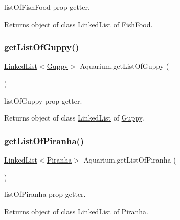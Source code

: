 list\+Of\+Fish\+Food prop getter. \begin{DoxyReturn}{Returns}
object of class \mbox{\hyperlink{class_linked_list}{Linked\+List}} of \mbox{\hyperlink{class_fish_food}{Fish\+Food}}. 
\end{DoxyReturn}
\mbox{\label{class_aquarium_a411ebb8e3ada997747567f59da24a020}} 
\subsubsection{\texorpdfstring{get\+List\+Of\+Guppy()}{getListOfGuppy()}}
{\footnotesize\ttfamily \mbox{\hyperlink{class_linked_list}{Linked\+List}}$<$\mbox{\hyperlink{class_guppy}{Guppy}}$>$ Aquarium.\+get\+List\+Of\+Guppy (\begin{DoxyParamCaption}{ }\end{DoxyParamCaption})\hspace{0.3cm}{\ttfamily [inline]}}

list\+Of\+Guppy prop getter. \begin{DoxyReturn}{Returns}
object of class \mbox{\hyperlink{class_linked_list}{Linked\+List}} of \mbox{\hyperlink{class_guppy}{Guppy}}. 
\end{DoxyReturn}
\mbox{\label{class_aquarium_a2427d901ce170774e36ca1a8ecbe8f4b}} 
\subsubsection{\texorpdfstring{get\+List\+Of\+Piranha()}{getListOfPiranha()}}
{\footnotesize\ttfamily \mbox{\hyperlink{class_linked_list}{Linked\+List}}$<$\mbox{\hyperlink{class_piranha}{Piranha}}$>$ Aquarium.\+get\+List\+Of\+Piranha (\begin{DoxyParamCaption}{ }\end{DoxyParamCaption})\hspace{0.3cm}{\ttfamily [inline]}}

list\+Of\+Piranha prop getter. \begin{DoxyReturn}{Returns}
object of class \mbox{\hyperlink{class_linked_list}{Linked\+List}} of \mbox{\hyperlink{class_piranha}{Piranha}}. 
\end{DoxyReturn}
\mbox{\label{class_aquarium_ac00cb1b361c2b368370f3fd1225ff296}} 
